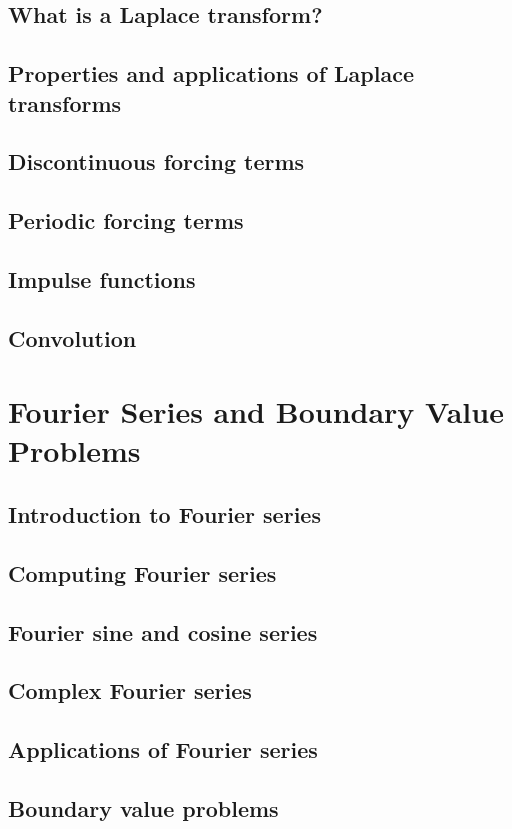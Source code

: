 \documentclass{article}
\begin{document}
\subsection{What is a Laplace transform?}
\subsection{Properties and applications of Laplace transforms}
\subsection{Discontinuous forcing terms}
\subsection{Periodic forcing terms}
\subsection{Impulse functions}
\subsection{Convolution}

\pagebreak
\section{Fourier Series and Boundary Value Problems}

\subsection{Introduction to Fourier series}
\subsection{Computing Fourier series}
\subsection{Fourier sine and cosine series}
\subsection{Complex Fourier series}
\subsection{Applications of Fourier series}
\subsection{Boundary value problems}
\end{document}
